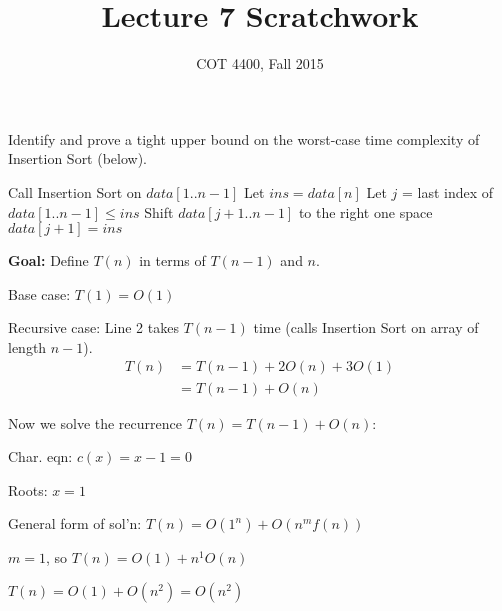 \documentclass{article}
\title{Lecture 7 Scratchwork}
\author{COT 4400, Fall 2015}
\begin{document}
\maketitle

Identify and prove a tight upper bound on the worst-case time complexity of Insertion Sort (below).

\begin{algorithm}
{
  Call Insertion Sort on $data[1..n-1]$\; %
  Let $ins = data[n]$\; %
  Let $j$ = last index of $data[1..n-1] \leq ins$\; %
  Shift $data[j+1..n-1]$ to the right one space\; %
  $data[j+1] = ins$\; %
}
\; %
\end{algorithm}

\textbf{Goal:}  Define $T(n)$ in terms of $T(n-1)$ and $n$.

Base case:  $T(1) = O(1)$

Recursive case:  Line 2 takes $T(n-1)$ time (calls Insertion Sort on array of length $n-1$).
\begin{align*}
T(n) & =  T(n-1) + 2O(n) + 3O(1)\\
& = T(n-1) + O(n)
\end{align*}

Now we solve the recurrence $T(n) = T(n-1) + O(n)$:

Char. eqn:  $c(x) = x - 1 = 0$

Roots:  $x = 1$

General form of sol'n:  $T(n) = O(1^n) + O(n^mf(n))$

$m = 1$, so $T(n) = O(1) + n^1O(n)$

$T(n) = O(1) + O(n^2) = O(n^2)$
\end{document}
